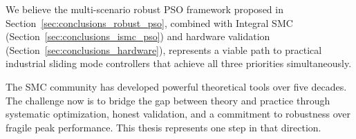 We believe the multi-scenario robust PSO framework proposed in Section~\ref{sec:conclusions_robust_pso}, combined with Integral SMC (Section~\ref{sec:conclusions_ismc_pso}) and hardware validation (Section~\ref{sec:conclusions_hardware}), represents a viable path to practical industrial sliding mode controllers that achieve all three priorities simultaneously.

The SMC community has developed powerful theoretical tools over five decades. The challenge now is to bridge the gap between theory and practice through systematic optimization, honest validation, and a commitment to robustness over fragile peak performance. This thesis represents one step in that direction.


